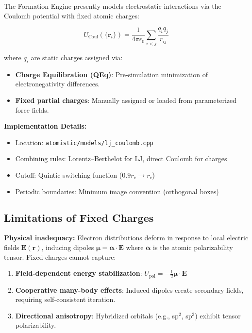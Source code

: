 \documentclass[11pt,letterpaper]{article}
\newcommand{\vr}{\mathbf{r}}
\newcommand{\vE}{\mathbf{E}}
\newcommand{\vmu}{\boldsymbol{\mu}}
\newcommand{\valpha}{\boldsymbol{\alpha}}
\begin{document}
The Formation Engine presently models electrostatic interactions via the Coulomb potential with fixed atomic charges:

\begin{equation}
U_{\text{Coul}}(\{\vr_i\}) = \frac{1}{4\pi\epsilon_0} \sum_{i<j} \frac{q_i q_j}{r_{ij}}
\end{equation}

where $q_i$ are static charges assigned via:
\begin{itemize}
    \item \textbf{Charge Equilibration (QEq)}\cite{rappe1991}: Pre-simulation minimization of electronegativity differences.
    \item \textbf{Fixed partial charges}: Manually assigned or loaded from parameterized force fields.
\end{itemize}

\noindent\textbf{Implementation Details:}
\begin{itemize}
    \item Location: \texttt{atomistic/models/lj\_coulomb.cpp}
    \item Combining rules: Lorentz--Berthelot for LJ, direct Coulomb for charges
    \item Cutoff: Quintic switching function ($0.9 r_c \to r_c$)
    \item Periodic boundaries: Minimum image convention (orthogonal boxes)
\end{itemize}

\subsection{Limitations of Fixed Charges}

\textbf{Physical inadequacy:} Electron distributions deform in response to local electric fields $\vE(\vr)$, inducing dipoles $\vmu = \valpha \cdot \vE$ where $\valpha$ is the atomic polarizability tensor. Fixed charges cannot capture:

\begin{enumerate}
    \item \textbf{Field-dependent energy stabilization}: $U_{\text{pol}} = -\frac{1}{2} \vmu \cdot \vE$
    \item \textbf{Cooperative many-body effects}: Induced dipoles create secondary fields, requiring self-consistent iteration.
    \item \textbf{Directional anisotropy}: Hybridized orbitals (e.g., sp$^2$, sp$^3$) exhibit tensor polarizability.
\end{enumerate}
\end{document}

